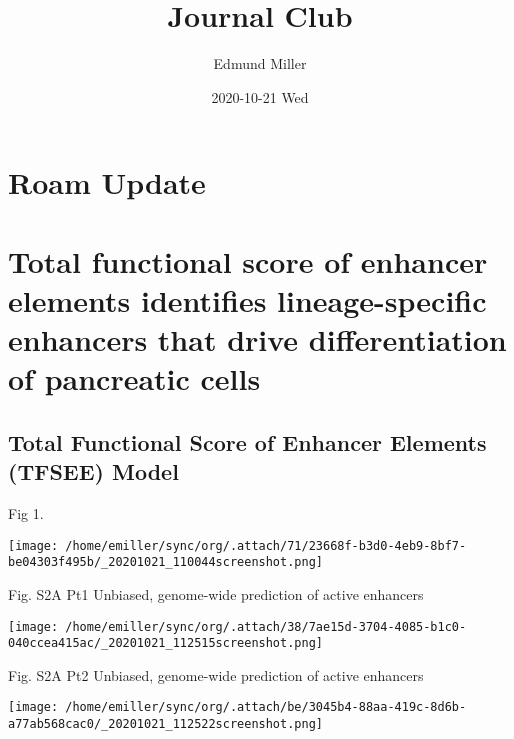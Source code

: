\documentclass[bigger]{beamer}
\author{Edmund Miller}
\date{2020-10-21 Wed}
\title{Journal Club}
\begin{document}
\maketitle
\section{Roam Update}
\label{sec:org07d4d71}
\section{Total functional score of enhancer elements identifies lineage-specific enhancers that drive differentiation of pancreatic cells}
\label{sec:org1786a88}
\subsection{Total Functional Score of Enhancer Elements (TFSEE) Model}
\label{sec:orgcdaec4e}
\begin{frame}[label={sec:orgfadfdec}]{Fig 1.}
\begin{center}
\texttt{[image: /home/emiller/sync/org/.attach/71/23668f-b3d0-4eb9-8bf7-be04303f495b/\_20201021\_110044screenshot.png]}
\end{center}
\end{frame}

\begin{frame}[label={sec:org638ff74}]{Fig. S2A Pt1 Unbiased, genome-wide prediction of active enhancers}
\begin{center}
\texttt{[image: /home/emiller/sync/org/.attach/38/7ae15d-3704-4085-b1c0-040ccea415ac/\_20201021\_112515screenshot.png]}
\end{center}
\end{frame}

\begin{frame}[label={sec:org8e4cc61}]{Fig. S2A Pt2 Unbiased, genome-wide prediction of active enhancers}
\begin{center}
\texttt{[image: /home/emiller/sync/org/.attach/be/3045b4-88aa-419c-8d6b-a77ab568cac0/\_20201021\_112522screenshot.png]}
\end{center}
\end{frame}
\end{document}
